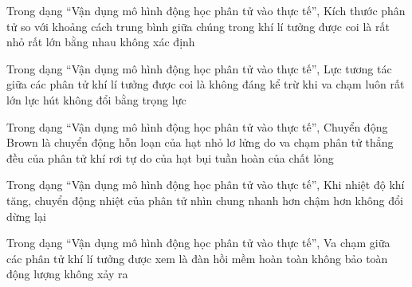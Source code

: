 \begin{ex}
Trong dạng “Vận dụng mô hình động học phân tử vào thực tế”, Kích thước phân tử so với khoảng cách trung bình giữa chúng trong khí lí tưởng được coi là
\choice
{\True rất nhỏ}
{rất lớn}
{bằng nhau}
{không xác định}
\end{ex}

\begin{ex}
Trong dạng “Vận dụng mô hình động học phân tử vào thực tế”, Lực tương tác giữa các phân tử khí lí tưởng được coi là
\choice
{\True không đáng kể trừ khi va chạm}
{luôn rất lớn}
{lực hút không đổi}
{bằng trọng lực}
\end{ex}

\begin{ex}
Trong dạng “Vận dụng mô hình động học phân tử vào thực tế”, Chuyển động Brown là chuyển động
\choice
{\True hỗn loạn của hạt nhỏ lơ lửng do va chạm phân tử}
{thẳng đều của phân tử khí}
{rơi tự do của hạt bụi}
{tuần hoàn của chất lỏng}
\end{ex}

\begin{ex}
Trong dạng “Vận dụng mô hình động học phân tử vào thực tế”, Khi nhiệt độ khí tăng, chuyển động nhiệt của phân tử nhìn chung
\choice
{\True nhanh hơn}
{chậm hơn}
{không đổi}
{dừng lại}
\end{ex}

\begin{ex}
Trong dạng “Vận dụng mô hình động học phân tử vào thực tế”, Va chạm giữa các phân tử khí lí tưởng được xem là
\choice
{\True đàn hồi}
{mềm hoàn toàn}
{không bảo toàn động lượng}
{không xảy ra}
\end{ex}

